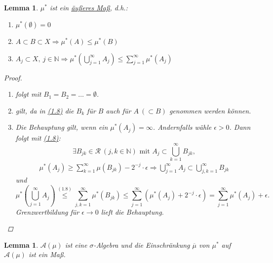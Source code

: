 \documentclass[a4paper]{scrreprt}
\newcommand{\N}{\mathbb{N}}
\newcommand{\jlabel}[1]{\label{j_#1}}
\newcommand{\jhyperref}[2]{\hyperref[j_#1]{#2}}
\newcommand{\jlink}[1]{\jhyperref{#1}{#1}}
\theoremstyle{plain}
\newtheorem{lem}[thm]{Lemma}
\theoremstyle{definition}
\begin{document}
{{{\begin{lem}
\jlabel{Lem 1.22}
    $\mu^*$ ist ein \uline{äußeres Maß}, d.h.:
    \begin{enumerate}
        \item $\mu^*(\emptyset) = 0$
        \item $A\subset B \subset X \Rightarrow \mu^*(A) \le \mu^*(B)$
        \item $A_j \subset X, \ j\in\N \Rightarrow \mu^*\left(\bigcup_{j=1}^\infty A_j \right) \le \sum_{j=1}^\infty \mu^*(A_j)$
    \end{enumerate}
    \begin{proof}
        \begin{enumerate}
            \item folgt mit $B_1 = B_2 = \dots = \emptyset$.
            \item gilt, da in \jlink{(1.8)} die $B_k$ für $B$ auch für $A\ (\subset B)$ genommen werden können.
            \item Die Behauptung gilt, wenn ein $\mu^*(A_j)=\infty$. Andernfalls wähle $\epsilon>0$. Dann folgt mit \jlink{(1.8)}: 
            \begin{displaymath}
                \exists B_{jk} \in \mathcal{R} \ (j,k \in \N)\text{ mit }A_j \subset \bigcup_{k=1}^\infty B_{jk},
            \end{displaymath}
            \begin{displaymath}
                \begin{split}
                    \mu^*(A_j) \ge \sum_{k=1}^\infty \mu(B_{jk}) -2^{-j}\cdot \epsilon \Rightarrow \bigcup_{j=1}^\infty A_j \subset \bigcup_{j,k=1}^\infty B_{jk}
                \end{split}
            \end{displaymath}
            und
            \begin{displaymath}
                \mu^*(\bigcup_{j=1}^\infty A_j) \overset{\jlink{(1.8)}}{\le} \sum_{j,k=1}^\infty \mu^*(B_{jk}) \le \sum_{j=1}^\infty (\mu^*(A_j) + 2^{-j}\cdot \epsilon) = \sum_{j=1}^\infty \mu^*(A_j) + \epsilon.
            \end{displaymath}
            Grenzwertbildung für $\epsilon \rightarrow 0$ lieft die Behauptung.
        \end{enumerate}
    \end{proof}
\end{lem}

\begin{lem}
\jlabel{Lem 1.23}
    $\mathcal{A}(\mu)$ ist eine $\sigma$-Algebra und die Einschränkung $\overline{\mu}$ von $\mu^*$ auf $\mathcal{A}(\mu)$ ist ein Maß.
\end{lem}

}}}
\end{document}
